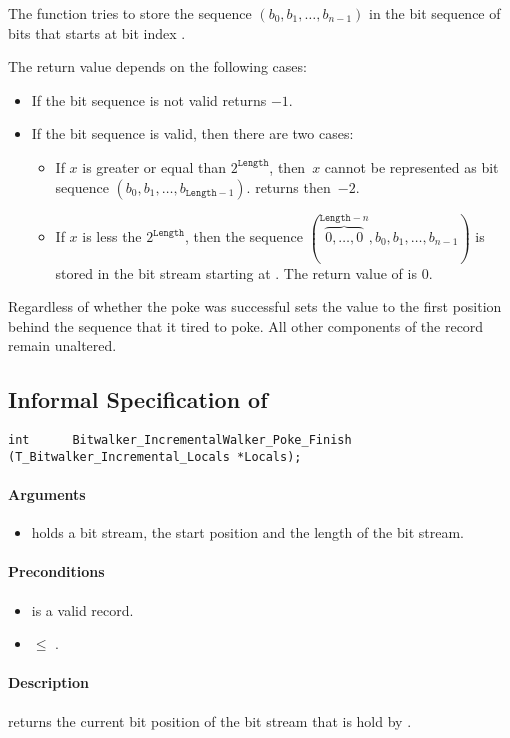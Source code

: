 The function \pokenext tries to store the sequence $(b_0, b_1,\ldots,b_{n - 1})$
in the bit sequence of  bits that starts
at bit index .

The return value depends on  the following cases:
\begin{itemize}
    \item  If the bit sequence is not valid \peeknext  returns $-1$.
    \item  If the bit sequence is valid, then there are two cases:
\begin{itemize}
\item
If $x$ is greater or equal than $2^\mathtt{Length}$, then~$x$
cannot be represented as bit sequence $(b_0, b_1,\ldots,b_{\mathtt{Length} - 1})$.
\pokenext returns then~$-2$.

\item
If $x$ is less the $2^{\mathtt{Length}}$, then  the sequence
$(\overbrace{0,\ldots,0}^{\mathtt{Length}-n},b_0, b_1,\ldots,b_{n - 1})$
is stored in the bit stream starting at .
The return value of \pokenext is 0.

\end{itemize}
\end{itemize}

Regardless of whether the poke was successful \pokenext sets the value   to the first position behind the sequence that it tired to poke.
 All other components of the record  remain unaltered.


\clearpage

\subsection{Informal Specification of }

\begin{lstlisting}[style=acsl-block]
int		 Bitwalker_IncrementalWalker_Poke_Finish (T_Bitwalker_Incremental_Locals *Locals);
\end{lstlisting}

\paragraph{Arguments}
\begin{itemize}
    \item  {} holds a bit stream, the start position and the length of the bit stream.
\end{itemize}

\paragraph{Preconditions}
\begin{itemize}
    \item  {} is a valid record.
    \item {} $\leq $ .
\end{itemize}

\paragraph{Description}

\peekfinish  returns the current bit position of the bit stream that is hold by .



